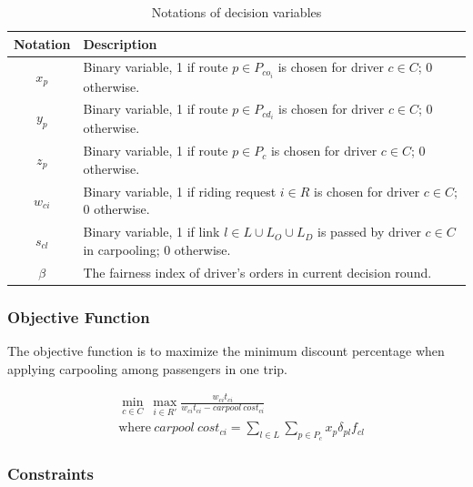 \begin{longtable}{cp{14cm}}
  \caption{Notations of decision variables}\\
  \toprule
  \multicolumn{1}{l}{Notation}&
  \multicolumn{1}{l}{Description}\\
  \midrule
  \endhead
    $x_{p}$ & Binary variable, 1 if route $p \in P_{co_i}$ is chosen for driver $c \in C$; 0 otherwise. \\
    $y_{p}$ & Binary variable, 1 if route $p \in P_{cd_i}$ is chosen for driver $c \in C$; 0 otherwise. \\
    $z_{p}$ & Binary variable, 1 if route $p \in P_c$ is chosen for driver $c \in C$; 0 otherwise. \\
    $w_{ci}$ & Binary variable, 1 if riding request $i \in R$ is chosen for driver $c \in C$; 0 otherwise. \\
    $s_{cl}$ & Binary variable, 1 if link $l \in L \cup L_O \cup L_D$ is passed by driver $c \in C$ in carpooling; 0 otherwise. \\
    $\beta$ & The fairness index of driver's orders in current decision round. \\
  \bottomrule
\end{longtable}  
\newpage

\subsubsection*{Objective Function}

The objective function is to maximize the minimum discount percentage when applying carpooling among passengers in one trip.

\begin{align*}
  & \underset{c \in C}{\operatorname{min}}\ \underset{i \in R'}{\operatorname{max}} \frac{w_{ci} t_{ci}}{w_{ci} t_{ci} - carpool\ cost_{ci}} \tag{IP1} \\
  & \text{where}\ carpool\ cost_{ci} = \sum\limits_{l \in L} \sum\limits_{p \in P_c} x_p \delta_{pl} f_{cl}
\end{align*}

\subsubsection*{Constraints}

